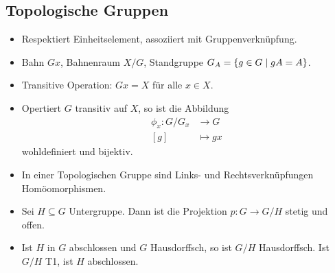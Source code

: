 \documentclass[8pt]{extarticle}
\begin{document}
\subsection*{Topologische Gruppen}
\begin{itemize}
	\item {} Respektiert Einheitselement, assoziiert mit Gruppenverknüpfung.
	\item Bahn $Gx$, Bahnenraum $X/G$, Standgruppe $G_A = \qty{g \in G \mid gA = A}$.
	\item Transitive Operation: $Gx = X$ für alle $x \in X$.
	\item Opertiert $G$ transitiv auf $X$, so ist die Abbildung
	\begin{align*}
		\phi_x : G/G_x &\to G\\
		[g] &\mapsto gx
	\end{align*}
	wohldefiniert und bijektiv.
	\item In einer Topologischen Gruppe sind Links- und Rechtsverknüpfungen Homöomorphismen.
	\item Sei $H \subseteq G$ Untergruppe. Dann ist die Projektion $p : G \to G/H$ stetig und offen.
	\item Ist $H$ in $G$ abschlossen und $G$ Hausdorffsch, so ist $G/H$ Hausdorffsch. Ist $G/H$ T1, ist $H$ abschlossen.
\end{itemize}
\end{document}
